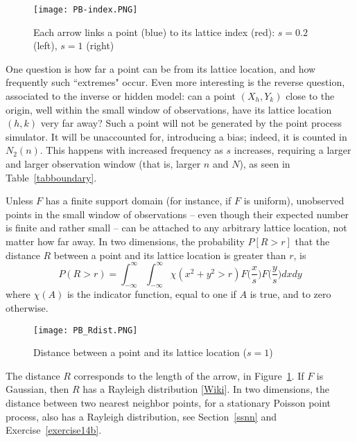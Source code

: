 \documentclass[10pt]{article}
\begin{document}
\begin{figure}[H]
\centering
\texttt{[image: PB-index.PNG]}
\caption{Each arrow links a point (blue) to its lattice index (red): $s=0.2$ (left), $s=1$ (right)}
\label{fig:index}
\end{figure}

One question is how far a point can be from its lattice location, and how frequently such ``extremes" occur. Even more interesting is the reverse question, associated to the
inverse or \textcolor{index}{hidden model}: can a point $(X_h,Y_k)$ close to the origin, well within the small window of observations, have its lattice location
$(h,k)$ very far away? Such a point  will not be generated by the point process simulator. It will be unaccounted for, introducing a bias; indeed, it is counted in $N_2(n)$. This happens with increased frequency as $s$ increases, requiring a larger and larger observation window (that is, larger $n$ and $N$), as seen in Table~\ref{tabboundary}.

Unless $F$ has a finite support domain (for instance, if $F$ is uniform), unobserved points in the small window of observations -- even though their expected number is finite and rather small -- can be attached to any arbitrary lattice location, not matter how far away. In two dimensions, the probability $P[R>r]$ that the distance $R$ between a point and its lattice location is greater than $r$, is
$$P(R>r)=\int_{-\infty}^\infty \int_{-\infty}^\infty  \chi(x^2+y^2 > r) F\Big(\frac{x}{s}\Big)F\Big(\frac{y}{s}\Big)dx dy$$
where $\chi(A)$ is the indicator function, equal to one if $A$ is true, and to zero otherwise.

\begin{figure}%
\centering
\texttt{[image: PB\_Rdist.PNG]}
\caption{Distance between a point and its lattice location ($s=1$)}
\label{fig:index2}
\end{figure}

The distance $R$ corresponds to the length of the arrow, in Figure~\ref{fig:index}. If $F$ is Gaussian, then $R$ has a
\textcolor{index}{Rayleigh distribution}  [\href{https://en.wikipedia.org/wiki/Rayleigh_distribution}{Wiki}]. In two dimensions, the distance between
two nearest neighbor points, for a stationary Poisson point process, also has a Rayleigh distribution, see Section~\ref{ssnn} and Exercise~\ref{exercise14b}. \\
\end{document}

